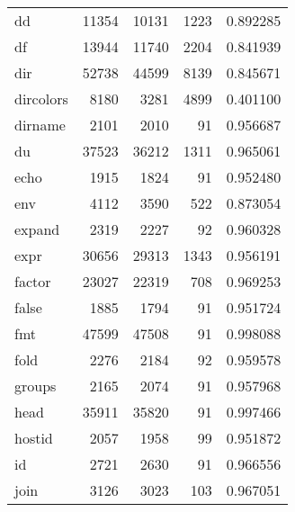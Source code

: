 \begin{tabular}{lrrrr}
dd        &                    11354 &        10131 &          1223 &                 0.892285 \\
df        &                    13944 &        11740 &          2204 &                 0.841939 \\
dir       &                    52738 &        44599 &          8139 &                 0.845671 \\
dircolors &                     8180 &         3281 &          4899 &                 0.401100 \\
dirname   &                     2101 &         2010 &            91 &                 0.956687 \\
du        &                    37523 &        36212 &          1311 &                 0.965061 \\
echo      &                     1915 &         1824 &            91 &                 0.952480 \\
env       &                     4112 &         3590 &           522 &                 0.873054 \\
expand    &                     2319 &         2227 &            92 &                 0.960328 \\
expr      &                    30656 &        29313 &          1343 &                 0.956191 \\
factor    &                    23027 &        22319 &           708 &                 0.969253 \\
false     &                     1885 &         1794 &            91 &                 0.951724 \\
fmt       &                    47599 &        47508 &            91 &                 0.998088 \\
fold      &                     2276 &         2184 &            92 &                 0.959578 \\
groups    &                     2165 &         2074 &            91 &                 0.957968 \\
head      &                    35911 &        35820 &            91 &                 0.997466 \\
hostid    &                     2057 &         1958 &            99 &                 0.951872 \\
id        &                     2721 &         2630 &            91 &                 0.966556 \\
join      &                     3126 &         3023 &           103 &                 0.967051 \\

\end{tabular}
